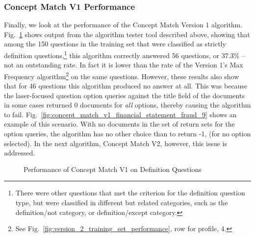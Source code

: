 \subsubsection{Concept Match V1 Performance}

Finally, we look at the performance of the Concept Match Version 1 algorithm.  Fig.~\ref{fig:concept_match_v1_training_set_results_def} shows output from the algorithm tester tool described above, showing that among the 150 questions in the training set that were classified as strictly definition questions,\footnote{There were other questions that met the criterion for the definition question type, but were classified in different but related categories, such as the definition/not category, or definition/except category.} this algorithm correctly answered 56 questions, or 37.3\% -- not an outstanding rate.  In fact it is lower than the rate of the Version 1's Max Frequency algorithm\footnote{See  Fig.~\ref{fig:version_2_training_set_performance}, row for profile, 4.} on the same questions. However, these results also show that for 46 questions this algorithm produced no answer at all.  This was because the laser-focused question option queries against the title field of the documents in some cases returned 0 documents for \emph{all} options, thereby causing the algorithm to fail.  Fig.~\ref{fig:concept_match_v1_financial_statement_fraud_9} shows an example of this scenario.  With no documents in the set of return sets for the option queries, the algorithm has no other choice than to return -1, (for no option selected).  In the next algorithm, Concept Match V2, however, this issue is addressed.


\begin{figure}
\centering
\vspace{1.0in}
\caption{Performance of Concept Match V1 on Definition Questions}
\label{fig:concept_match_v1_training_set_results_def}
\end{figure}

